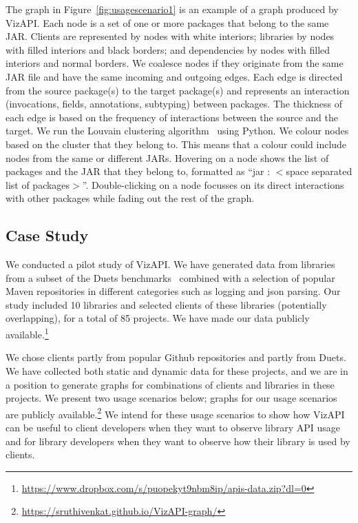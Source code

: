 The graph in Figure~\ref{fig:usagescenario1}
is an example of a graph produced by VizAPI.
Each node is a set of one or more packages that belong to the same JAR. 
Clients are represented by nodes with white interiors; libraries by nodes with filled interiors and black borders;
and dependencies by nodes with filled interiors and normal borders.
We coalesce nodes if they originate from the same 
JAR file and have the same incoming and outgoing edges. Each edge is directed 
from the source package(s) to the target package(s) and represents an interaction 
(invocations, fields, annotations, subtyping) between packages. 
The thickness of each edge is based on the frequency of interactions between the source and the target.
We run the Louvain clustering algorithm~\cite{blondel2008fast} using Python. 
We colour nodes based on the cluster that they belong to. 
This means that a colour could include nodes from the same or different JARs.
Hovering on a node shows the list of packages and 
the JAR that they belong to, 
formatted as “jar : $<$space separated list of packages$>$”. 
Double-clicking on a node focusses on its direct interactions with other packages while fading out the rest of the graph.

\subsection{Case Study}
\label{subsec:evaluation}

We conducted a pilot study of VizAPI.
We have generated data from libraries from a subset of the
Duets benchmarks~\cite{durieux21} combined with a selection of
popular Maven repositories 
in different categories such as logging and json parsing.
Our study included 10 libraries and
selected clients of these libraries (potentially overlapping), for a total of 85 projects.
We have made our data publicly available.\footnote{\url{https://www.dropbox.com/s/puopekyt9nbm8ip/apis-data.zip?dl=0}}

We chose clients partly
from popular Github repositories and partly from Duets.
We have collected both static and dynamic data for these projects, 
and we are in a position
to generate graphs for combinations of clients and libraries
in these projects. 
We present two usage scenarios below; graphs for 
our usage scenarios are publicly available.\footnote{\url{https://sruthivenkat.github.io/VizAPI-graph/}}
We intend for these usage scenarios to show how VizAPI can be useful to client developers when they want to observe library API usage and for library developers when they want to observe how their library is used by clients.

